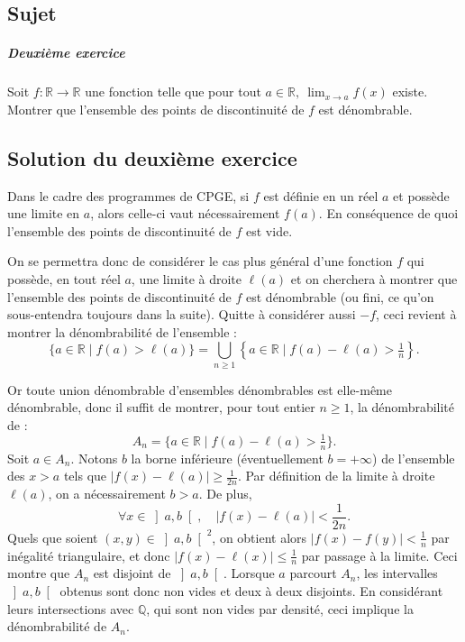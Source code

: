 \chapter{}

\section{Sujet}

\paragraph{Deuxième exercice}

Soit $f : \mathbb R \to \mathbb R$ une fonction telle que pour tout $a \in \mathbb R,\ \lim_{x\to a} f(x)$ existe.
Montrer que l'ensemble des points de discontinuité de $f$ est dénombrable.

\section{Solution du deuxième exercice}

Dans le cadre des programmes de CPGE, si $f$ est définie en un réel $a$ et possède une limite en $a$, alors celle-ci vaut nécessairement $f(a)$. En conséquence de quoi l'ensemble des points de discontinuité de $f$ est vide.

On se permettra donc de considérer le cas plus général d'une fonction $f$ qui possède, en tout réel $a$, une limite à droite $\ell(a)$ et on cherchera à montrer que l'ensemble des points de discontinuité de $f$ est dénombrable (ou fini, ce qu'on sous-entendra toujours dans la suite). Quitte à considérer aussi $-f$, ceci revient à montrer la dénombrabilité de l'ensemble :
\[
\{a \in \mathbb R \mid f(a) > \ell(a)\} = \bigcup_{n\geqslant 1} \left\{a \in \mathbb R \mid f(a) - \ell(a) > \tfrac1n\right\}.
\]

Or toute union dénombrable d'ensembles dénombrables est elle-même dénombrable, donc il suffit de montrer, pour tout entier $n \geqslant 1$, la dénombrabilité de :
\[
A_n = \{a \in \mathbb R \mid f(a) - \ell(a) > \tfrac1n\}.
\]
Soit $a \in A_n$. Notons $b$ la borne inférieure (éventuellement $b = +\infty$) de l'ensemble des $x > a$ tels que $|f(x) - \ell(a)| \geqslant \frac1{2n}$. Par définition de la limite à droite $\ell(a)$, on a nécessairement $b > a$. De plus,
\[
\forall x \in \left]a,b\right[,\quad |f(x) - \ell(a)| < \frac1{2n}.
\]
Quels que soient $(x,y) \in \left]a,b\right[^2$, on obtient alors $|f(x)-f(y)| < \frac1n$ par inégalité triangulaire, et donc $|f(x) - \ell(x)| \leqslant \frac1n$ par passage à la limite. Ceci montre que $A_n$ est disjoint de $\left]a,b\right[$.
Lorsque $a$ parcourt $A_n$, les intervalles $\left]a,b\right[$ obtenus sont donc non vides et deux à deux disjoints. En considérant leurs intersections avec $\mathbb Q$, qui sont non vides par densité, ceci implique la dénombrabilité de $A_n$.

